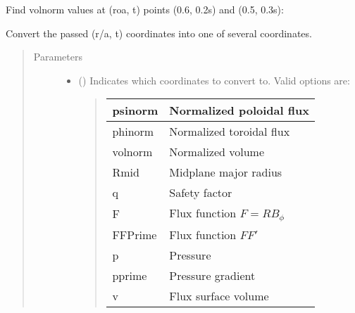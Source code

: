 \documentclass[letterpaper,10pt,english]{sphinxmanual}
\begin{document}
\begin{fulllineitems}
\begin{fulllineitems}
Find volnorm values at (roa, t) points (0.6, 0.2s) and (0.5, 0.3s):

\begin{sphinxVerbatim}[commandchars=\\\{\}]
  \PYG{p}{[} \PYG{p}{]} \PYG{p}{[} \PYG{p}{]} 
\end{sphinxVerbatim}

\end{fulllineitems}


\begin{fulllineitems}
\label{\detokenize{eqtools:eqtools.core.Equilibrium.roa2rho}}
Convert the passed (r/a, t) coordinates into one of several coordinates.
\begin{quote}\begin{description}
\item[{Parameters}] \leavevmode\begin{itemize}
\item {} 
 () \textendash{} 
Indicates which coordinates to convert to.
Valid options are:
\begin{quote}


\begin{savenotes}\sphinxattablestart
\centering
\begin{tabulary}{\linewidth}[t]{|T|T|}
\hline

psinorm
&
Normalized poloidal flux
\\
\hline
phinorm
&
Normalized toroidal flux
\\
\hline
volnorm
&
Normalized volume
\\
\hline
Rmid
&
Midplane major radius
\\
\hline
q
&
Safety factor
\\
\hline
F
&
Flux function \(F=RB_{\phi}\)
\\
\hline
FFPrime
&
Flux function \(FF'\)
\\
\hline
p
&
Pressure
\\
\hline
pprime
&
Pressure gradient
\\
\hline
v
&
Flux surface volume
\\
\hline
\end{tabulary}
\par
\sphinxattableend\end{savenotes}
\end{quote}


\end{itemize}
\end{description}
\end{quote}
\end{fulllineitems}
\end{fulllineitems}
\end{document}

